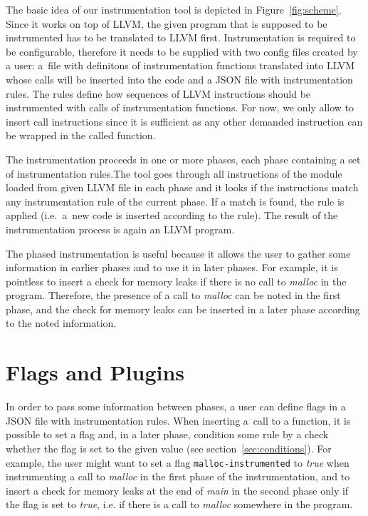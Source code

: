 The basic idea of our instrumentation tool is depicted in
Figure~\ref{fig:scheme}. Since it works on top of LLVM, the given program that is
supposed to be instrumented has to be translated to LLVM first. Instrumentation
is required to be configurable, therefore it needs to be supplied with two
config files created by a user: a~file with definitons of instrumentation
functions translated into LLVM whose calls will be inserted into the code and a
JSON file with instrumentation rules. The rules define how sequences of LLVM
instructions should be instrumented with calls of instrumentation functions.
For now, we only allow to insert call instructions since it is sufficient as
any other demanded instruction can be wrapped in the called function.

The instrumentation proceeds in one or more phases, each phase containing a set
of instrumentation rules.The tool goes through all instructions of the module
loaded from given LLVM file in each phase and it looks if the instructions
match any instrumentation rule of the current phase. If a match is found, the
rule is applied (i.e.~a~new code is inserted according to the rule). The result
of the instrumentation process is again an LLVM program.

The phased instrumentation is useful because it allows the user to gather some
information in earlier phases and to use it in later phases. For example, it is
pointless to insert a check for memory leaks if there is no call to
\emph{malloc} in the program. Therefore, the presence of a call to
\emph{malloc} can be noted in the first phase, and the check for memory leaks
can be inserted in a later phase according to the noted information.

\section{Flags and Plugins}

In order to pass some information between phases, a user can define flags in a
JSON file with instrumentation rules. When inserting a~call to a function, it
is possible to set a flag and, in a later phase, condition some rule by a check
whether the flag is set to the given value (see section~\ref{sec:conditions}).
For example, the user might want to set a flag \texttt{malloc-instrumented} to
\emph{true} when instrumenting a call to \emph{malloc} in the first phase of
the instrumentation, and to insert a check for memory leaks at the end of
\emph{main} in the second phase only if the flag is set to \emph{true}, i.e. if
there is a call to \emph{malloc} somewhere in the program.

